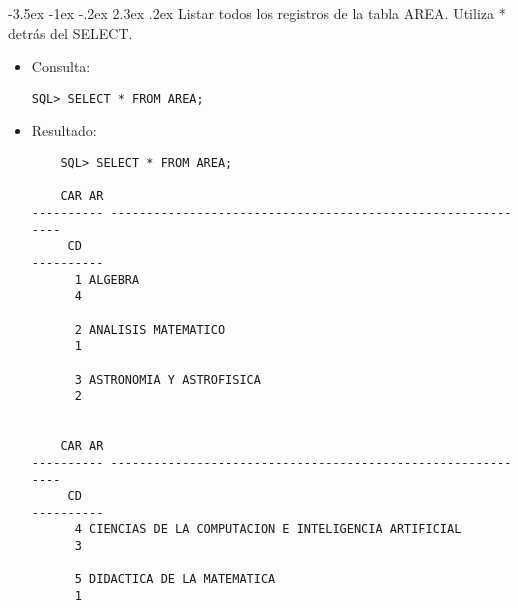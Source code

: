 \documentclass[11pt]{report}
\makeatletter
\renewcommand\chapter{\@startsection{chapter}{0}{\z@}%
    {-3.5ex \@plus -1ex \@minus -.2ex}%
    {2.3ex \@plus.2ex}%
    {\normalfont\Large\bfseries}}
\makeatother
\begin{document}
\chapter{Listar todos los registros de la tabla AREA. Utiliza * detrás del SELECT.}
\begin{itemize}
  \item Consulta:
  \begin{verbatim}
SQL> SELECT * FROM AREA;
  \end{verbatim}
  \item{Resultado:}
  \begin{verbatim}
    SQL> SELECT * FROM AREA;

    CAR AR                                                                   
---------- ------------------------------------------------------------         
     CD                                                                      
----------                                                                      
      1 ALGEBRA                                                              
      4                                                                      
                                                                             
      2 ANALISIS MATEMATICO                                                  
      1                                                                      
                                                                             
      3 ASTRONOMIA Y ASTROFISICA                                             
      2                                                                      
                                                                             

    CAR AR                                                                   
---------- ------------------------------------------------------------         
     CD                                                                      
----------                                                                      
      4 CIENCIAS DE LA COMPUTACION E INTELIGENCIA ARTIFICIAL                 
      3                                                                      
                                                                             
      5 DIDACTICA DE LA MATEMATICA                                           
      1                                                                      
                                                                             

\end{verbatim}
\end{itemize}
\end{document}
